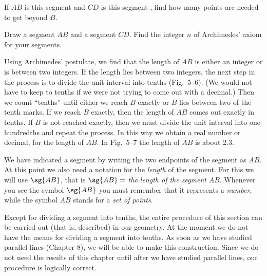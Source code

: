 \documentclass[11pt]{book}
\theoremstyle{bkplain}
\theoremstyle{XIplainnote}
\theoremstyle{bkplain}
\theoremstyle{bkplain}
\begin{document}
\FIGVFOURFIVE


\begin{exercisecols}
\begin{exlist}
\item If $AB$ is this segment 
      and $CD$ is this segment
      , find how many
      points are needed to get beyond $B$.
\item Draw a segment $AB$ and a segment $CD$. Find the integer $n$ of
      Archimedes' axiom for your segments.
\end{exlist}
\end{exercisecols}

Using Archimedes' postulate, we find that the length of $AB$ is either an
integer or is between two integers. If the length lies between two integers,
the next step in the process is to divide the unit interval into tenths
(Fig.~5--6). (We would not have to keep to tenths if we were not trying to come
out with a decimal.) Then we count ``tenths'' until either we reach $B$ exactly
or $B$ lies between two of the tenth marks. If we reach $B$ exactly, then the
length of $AB$ comes out exactly in tenths. If $B$ is not reached exactly, then
we must divide the unit interval into one-hundredths and repeat the process. In
this way we obtain a real number or decimal, for the length of $AB$. In
Fig.~5--7 the length of $AB$ is about 2.3.

\FIGVSIXSEVEN

We have indicated a segment by writing the two endpoints of the segment as
$AB$. At this point we also need a notation for the \emph{length} of the
segment. For this we will use $\sg{AB}$, that is $\sg{AB} = $ \emph{the length
of the segment} $AB$. Whenever you see the symbol $\sg{AB}$ you must remember
that it represents a \emph{number}, while the symbol $AB$ stands for a \emph{set
of points}.

Except for dividing a segment into tenths, the entire procedure of this section
can be carried out (that is, described) in our geometry. At the moment we do
not have the means for dividing a segment into tenths. As soon as we have
studied parallel lines (Chapter 8), we will be able to make this construction.
Since we do not need the results of this chapter until after we have studied
parallel lines, our procedure is logically correct.

\end{document}
